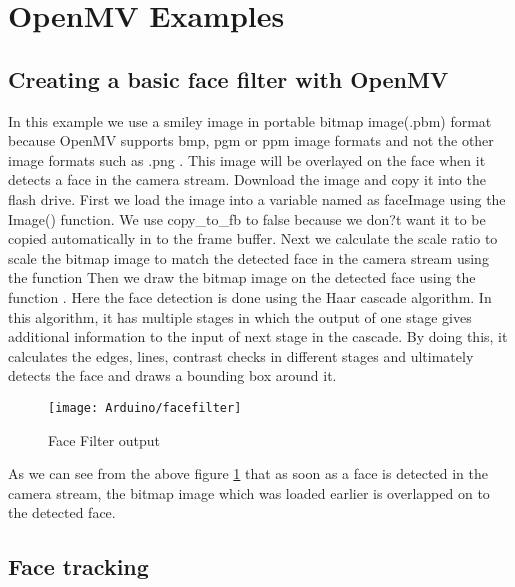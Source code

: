 \section{OpenMV Examples}

\subsection{Creating a basic face filter with OpenMV}

In this example we use a smiley image in portable bitmap image(.pbm) format because OpenMV supports bmp, pgm or ppm image formats and not the other image formats such as .png \cite{Romero:2020}.  This image will be overlayed on the face when it detects a face in the camera stream. 
Download the image and copy it into the flash drive.
First we load the image into a variable named as faceImage using the Image() function. We use copy\_to\_fb to false because we don?t want it to be copied automatically in to the frame buffer. Next we calculate the scale ratio to scale the bitmap image to match the detected face in the camera stream using the function 
Then we draw the bitmap image on the detected face using the function .
Here the face detection is done using the Haar cascade algorithm. In this algorithm, it has multiple stages in which the output of one stage gives additional information  to the input of next stage in the cascade. By doing this, it calculates the edges, lines, contrast checks in different stages and ultimately detects the face and draws a bounding box around it. 


\begin{figure}[H]
	\centering
	\texttt{[image: Arduino/facefilter]}
	\caption{Face Filter output}
	\label{figure 6.10}
\end{figure}

As we can see from the above figure  \ref{figure 6.10} that as soon as a face is detected in the camera stream, the bitmap image which was loaded earlier is overlapped on to the detected face.

\subsection{Face tracking }

